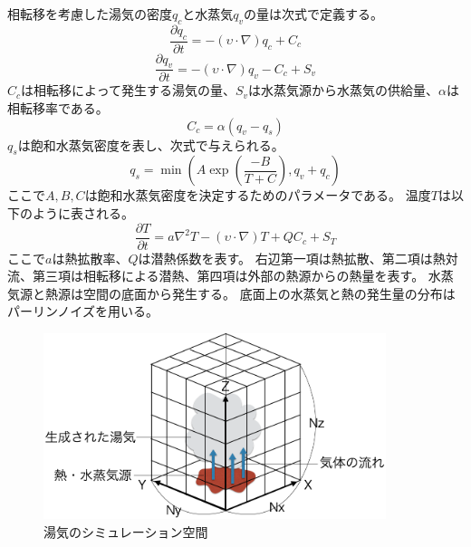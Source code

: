 相転移を考慮した湯気の密度$q_{c}$と水蒸気$q_{v}$の量は次式で定義する。
\begin{equation}
\label{steam}
\frac{\partial q_{c}}{\partial t} = -(\upsilon \cdot \nabla)q_{c} + C_{c}
\end{equation}
\begin{equation}
\label{vapor}
\frac{\partial q_{v}}{\partial t} = -(\upsilon \cdot \nabla)q_{v} - C_{c} + S_{v}
\end{equation}
$C_{c}$は相転移によって発生する湯気の量、$S_{v}$は水蒸気源から水蒸気の供給量、$\alpha$は相転移率である。
\begin{equation}
\label{transition}
C_{c} = \alpha(q_{v}-q_{s})
\end{equation}
$q_{s}$は飽和水蒸気密度を表し、次式で与えられる。	
\begin{equation}
\label{saturation}
q_{s} = \min\left(A \exp\left(\frac{-B}{T+C}\right),q_{v}+q_{c}\right)
\end{equation}
ここで$A,B,C$は飽和水蒸気密度を決定するためのパラメータである。
温度$T$は以下のように表される。
\begin{equation}
\label{temperature}
\frac{\partial T}{\partial t} = a\nabla^2T- (\upsilon \cdot \nabla)T +  QC_{c} + S_{T}
\end{equation}
ここで$a$は熱拡散率、$Q$は潜熱係数を表す。
右辺第一項は熱拡散、第二項は熱対流、第三項は相転移による潜熱、第四項は外部の熱源からの熱量を表す。
水蒸気源と熱源は空間の底面から発生する。
底面上の水蒸気と熱の発生量の分布はパーリンノイズ\cite{Perlin1985}\cite{Perlin2002}を用いる。
\begin{figure}
	\begin{center}
		\includegraphics[width=100mm]{simulation.png}
		\caption{湯気のシミュレーション空間}
		\label{simulation}
	\end{center}
\end{figure}



